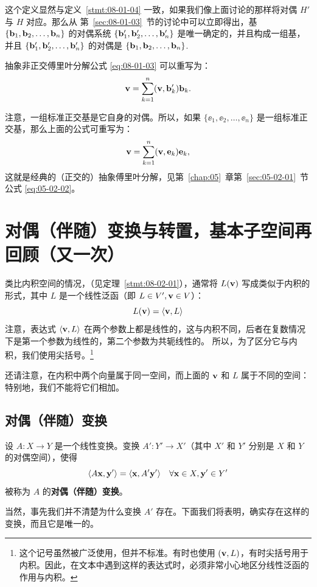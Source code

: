 这个定义显然与定义~\ref{stmt:08-01-04} 一致，如果我们像上面讨论的那样将对偶 $H'$ 与 $H$ 对应。那么从 第~\ref{sec:08-01-03}~节的讨论中可以立即得出，基 $\{\mathbf{b}_1, \mathbf{b}_2, \dots, \mathbf{b}_n\}$ 的对偶系统 $\{\mathbf{b}'_1, \mathbf{b}'_2, \dots, \mathbf{b}'_n\}$ 是唯一确定的，并且构成一组基，并且 $\{\mathbf{b}'_1, \mathbf{b}'_2, \dots, \mathbf{b}'_n\}$ 的对偶是 $\{\mathbf{b}_1, \mathbf{b}_2, \dots, \mathbf{b}_n\}$.~

抽象非正交傅里叶分解公式 \eqref{eq:08-01-03} 可以重写为：
$$ \mathbf{v} = \sum_{k=1}^n (\mathbf{v}, \mathbf{b}'_k) \mathbf{b}_k .$$

注意，一组标准正交基是它自身的对偶。所以，如果 $\{\ee_1, \ee_2, \dots, \ee_n\}$ 是一组标准正交基，那么上面的公式可重写为：
$$ \mathbf{v} = \sum_{k=1}^n (\mathbf{v}, \mathbf{e}_k) \mathbf{e}_k ,$$
这就是经典的（正交的）抽象傅里叶分解，见第~\ref{chap:05}~章第~\ref{sec:05-02-01}~节公式 \eqref{eq:05-02-02}。

\section{对偶（伴随）变换与转置，基本子空间再回顾（又一次）}\label{sec:08-03}

类比内积空间的情况，（见定理~\ref{stmt:08-02-01}），通常将 $L(\mathbf{v})$ 写成类似于内积的形式，其中 $L$ 是一个线性泛函（即 $L \in V', \mathbf{v} \in V$）：
$$ L(\mathbf{v}) = \langle \mathbf{v}, L \rangle $$
注意，表达式 $\langle \mathbf{v}, L \rangle$ 在两个参数上都是线性的，这与内积不同，后者在复数情况下是第一个参数为线性的，第二个参数为共轭线性的。
所以，为了区分它与内积，我们使用尖括号。\footnote{
这个记号虽然被广泛使用，但并不标准。有时也使用 $(\mathbf{v}, L)$，有时尖括号用于内积。因此，在文本中遇到这样的表达式时，必须非常小心地区分线性泛函的作用与内积。
}

还请注意，在内积中两个向量属于同一空间，而上面的 $\mathbf{v}$ 和 $L$ 属于不同的空间：特别地，我们不能将它们相加。

\subsection{对偶（伴随）变换}\label{sec:08-03-01}

\begin{definition}\label{stmt:08-03-01}
设 $A : X \to Y$ 是一个线性变换。变换 $A' : Y' \to X'$（其中 $X'$ 和 $Y'$ 分别是 $X$ 和 $Y$ 的对偶空间），使得
$$ \langle A\mathbf{x}, \mathbf{y}' \rangle = \langle \mathbf{x}, A'\mathbf{y}' \rangle \quad \forall \mathbf{x} \in X, \mathbf{y}' \in Y' $$
被称为 $A$ 的\textbf{对偶（伴随）变换}。
\end{definition}


当然，事先我们并不清楚为什么变换 $A'$ 存在。下面我们将表明，确实存在这样的变换，而且它是唯一的。

